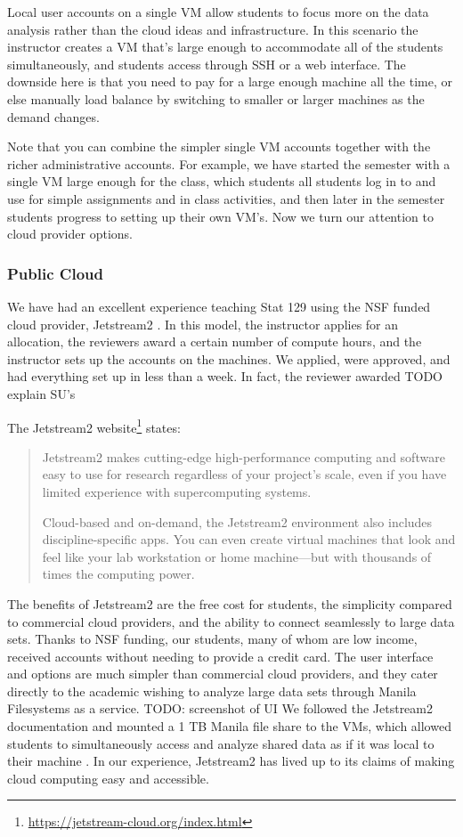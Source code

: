 \documentclass[12pt]{article}
\begin{document}
Local user accounts on a single VM allow students to focus more on the data analysis rather than the cloud ideas and infrastructure.
In this scenario the instructor creates a VM that's large enough to accommodate all of the students simultaneously, and students access through SSH or a web interface.
The downside here is that you need to pay for a large enough machine all the time, or else manually load balance by switching to smaller or larger machines as the demand changes.

Note that you can combine the simpler single VM accounts together with the richer administrative accounts.
For example, we have started the semester with a single VM large enough for the class, which students all students log in to and use for simple assignments and in class activities, and then later in the semester students progress to setting up their own VM's.
Now we turn our attention to cloud provider options.



\subsubsection{Public Cloud}

We have had an excellent experience teaching Stat 129 using the NSF funded cloud provider, Jetstream2 \cite{hancock2021jetstream2}.
In this model, the instructor applies for an allocation, the reviewers award a certain number of compute hours, and the instructor sets up the accounts on the machines.
We applied, were approved, and had everything set up in less than a week.
In fact, the reviewer awarded TODO explain SU's

The Jetstream2 website\footnote{\url{https://jetstream-cloud.org/index.html}} states:
\begin{quote}
Jetstream2 makes cutting-edge high-performance computing and software easy to use for research regardless of your project’s scale, even if you have limited experience with supercomputing systems.

Cloud-based and on-demand, the Jetstream2 environment also includes discipline-specific apps. You can even create virtual machines that look and feel like your lab workstation or home machine—but with thousands of times the computing power.
\end{quote}

The benefits of Jetstream2 are the free cost for students, the simplicity compared to commercial cloud providers, and the ability to connect seamlessly to large data sets.
Thanks to NSF funding, our students, many of whom are low income, received accounts without needing to provide a credit card.
The user interface and options are much simpler than commercial cloud providers, and they cater directly to the academic wishing to analyze large data sets through Manila Filesystems as a service.
TODO: screenshot of UI
We followed the Jetstream2 documentation and mounted a 1 TB Manila file share to the VMs, which allowed students to simultaneously access and analyze shared data as if it was local to their machine \cite{manila}.
In our experience, Jetstream2 has lived up to its claims of making cloud computing easy and accessible.
\end{document}
